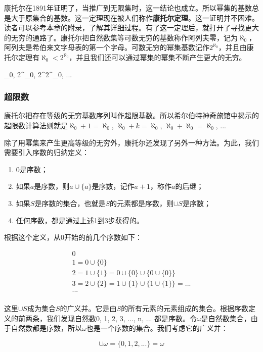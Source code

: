 \documentclass{article}
\begin{document}
康托尔在1891年证明了，当推广到无限集时，这一结论也成立。所以幂集的基数总是大于原集合的基数。这一定理现在被人们称作\textbf{康托尔定理}。这一证明并不困难。读者可以参考本章的附录，了解其详细过程。有了这一定理后，就打开了寻找更大的无穷的通路了。康托尔把自然数集等可数无穷的基数称作阿列夫零，记为$\aleph_0$，阿列夫是希伯来文字母表的第一个字母。可数无穷的幂集基数记作$2^{\aleph_0}$，并且由康托尔定理有$\aleph_0 < 2^{\aleph_0}$，并且我们还可以通过幂集的幂集不断产生更大的无穷。

\be
\aleph_0, 2^{\aleph_0}, 2^{2^{\aleph_0}}, ...
\ee

\subsubsection{超限数}

康托尔把存在等级的无穷基数序列叫作超限基数。所以希尔伯特神奇旅馆中揭示的超限数计算法则就是$\aleph_0 + 1 = \aleph_0$, $\aleph_0 + k = \aleph_0 $, $\aleph_0 + \aleph_0 = \aleph_0$, ...

除了用幂集来产生更高等级的无穷外，康托尔还发现了另外一种方法。为此，我们需要引入序数的归纳定义：

\begin{enumerate}
\item 0是序数；
\item 如果$a$是序数，则$a \cup \{a\}$是序数，记作$a + 1$，称作$a$的后继；
\item 如果$S$是序数的集合，也就是$S$的元素都是序数，则$\cup S$是序数；
\item 任何序数，都是通过上述1到3步获得的。
\end{enumerate}

根据这个定义，从0开始的前几个序数如下：

\[
\begin{array}{l}
0 \\
1 = 0 \cup \{0\} \\
2 = 1 \cup \{1\} = 0 \cup \{0\} \cup \{0 \cup \{0\}\} \\
3 = 2 \cup \{2\} = 1 \cup \{1\} \cup \{1 \cup \{1\}\} = ... \\
... \\
\end{array}
\]

这里$\cup S$成为集合$S$的广义并。它是由$S$的所有元素的元素组成的集合。根据序数定义的前两条，我们发现自然数0, 1, 2, 3, ..., n, ... 都是序数。令$\omega$是自然数集合，由于自然数都是序数，所以$\omega$也是一个序数的集合。我们考虑它的广义并：

\[
\cup \omega = \{0, 1, 2, ...\} = \omega
\]
\end{document}
